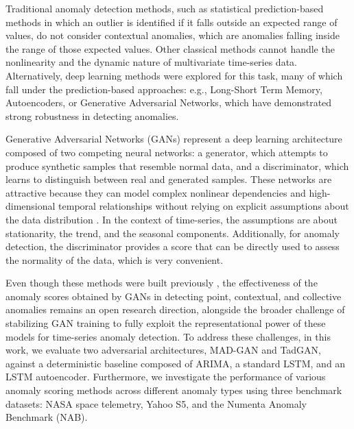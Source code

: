 Traditional anomaly detection methods, such as statistical prediction-based methods \cite{pena2013arima-ad} in which an outlier is identified if it falls outside an expected range of values, do not consider contextual anomalies, which are anomalies falling inside the range of those expected values. Other classical methods \cite{scholkopf1999oc-svm} \cite{liu2008iforest} cannot handle the nonlinearity and the dynamic nature of multivariate time-series data. Alternatively, deep learning methods were explored \cite{malhotra2015lstm-ad} \cite{li2019madgan} \cite{an2015vae-ae-ad} for this task, many of which fall under the prediction-based approaches: e.g., Long-Short Term Memory, Autoencoders, or Generative Adversarial Networks, which have demonstrated strong robustness in detecting anomalies.

Generative Adversarial Networks (GANs) represent a deep learning architecture composed of two competing neural networks: a generator, which attempts to produce synthetic samples that resemble normal data, and a discriminator, which learns to distinguish between real and generated samples. These networks are attractive because they can model complex nonlinear dependencies and high-dimensional temporal relationships without relying on explicit assumptions about the data distribution \cite{goodfellow2014gan}. In the context of time-series, the assumptions are about stationarity, the trend, and the seasonal components. Additionally, for anomaly detection, the discriminator provides a score that can be directly used to assess the normality of the data, which is very convenient.

Even though these methods were built previously \cite{li2019madgan} \cite{geiger2020tadgan} \cite{bashar2020tanogan}, the effectiveness of the anomaly scores obtained by GANs in detecting point, contextual, and collective anomalies remains an open research direction, alongside the broader challenge of stabilizing GAN training to fully exploit the representational power of these models for time-series anomaly detection. To address these challenges, in this work, we evaluate two adversarial architectures, MAD-GAN and TadGAN, against a deterministic baseline composed of ARIMA, a standard LSTM, and an LSTM autoencoder. Furthermore, we investigate the performance of various anomaly scoring methods across different anomaly types using three benchmark datasets: NASA space telemetry, Yahoo S5, and the Numenta Anomaly Benchmark (NAB).

\vspace{1em}

